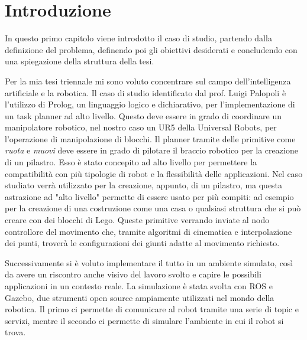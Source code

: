 \chapter{Introduzione}
\label{cha:intro}


In questo primo capitolo viene introdotto il caso di studio, partendo dalla definizione del problema, definendo poi gli obiettivi desiderati
e concludendo con una spiegazione della struttura della tesi.

Per la mia tesi triennale mi sono voluto concentrare sul campo dell'intelligenza artificiale e la robotica. Il caso di studio identificato
dal prof. Luigi Palopoli è l'utilizzo di Prolog, un linguaggio logico e dichiarativo, per l'implementazione di un task planner ad alto livello.
Questo deve essere in grado di coordinare un manipolatore robotico, nel nostro caso un UR5 della Universal Robots, per l'operazione di manipolazione di blocchi.
Il planner tramite delle primitive come \textit{ruota} e \textit{muovi} deve essere in grado di pilotare il braccio robotico per la
creazione di un pilastro. Esso è stato concepito ad alto livello per permettere la compatibilità con più tipologie di robot e la flessibilità
delle applicazioni. Nel caso studiato verrà utilizzato per la creazione, appunto, di un pilastro, ma questa astrazione ad
"alto livello" permette di essere usato per più compiti: ad esempio per la creazione di una costruzione come una casa o qualsiasi struttura
che si può creare con dei blocchi di Lego. Queste primitive verrando inviate al nodo controllore del movimento che, tramite algoritmi di cinematica e
interpolazione dei punti, troverà le configurazioni dei giunti adatte al movimento richiesto. 

Successivamente si è voluto implementare il tutto in un
ambiente simulato, così da avere un riscontro anche visivo del lavoro svolto e capire le possibili applicazioni in un contesto reale.
La simulazione è stata svolta con ROS e Gazebo, due strumenti open source ampiamente utilizzati nel mondo della robotica. Il primo ci permette di
comunicare al robot tramite una serie di topic e servizi, mentre il secondo ci permette di simulare l'ambiente in cui il robot si trova.

